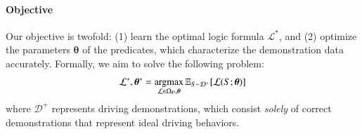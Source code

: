 \paragraph{Objective}
Our objective is twofold: (1) learn the optimal logic formula $\mathcal{L}^*$, and (2) optimize the parameters $\boldsymbol{\theta}$ of the predicates, which characterize the demonstration data accurately.
Formally, we aim to solve the following problem:
\begin{align}
    \mathcal{L}^*, \boldsymbol{\theta}^* = \mathop{\mathrm{argmax}}_{\mathcal{L} \in \Omega_{\mathcal{P}}, \boldsymbol{\theta}} \mathbb{E}_{S \sim \mathcal{D}^+} [\mathcal{L}(S; \boldsymbol{\theta})]
\end{align}
\label{eq:objective}
where $\mathcal{D}^+$ represents driving demonstrations, which consist \textit{solely} of correct demonstrations that represent ideal driving behaviors.